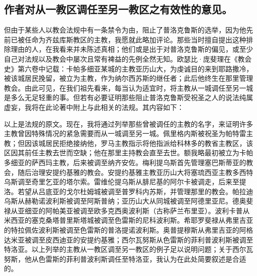 
\subsection{作者对从一教区调任至另一教区之有效性的意见。\newline{}}

但由于某些人以教会法规中有一条禁令为由，阻止了普洛克鲁斯的选举，因为他先前已被任命为齐兹库斯教区的主教，我愿就此略加评论。那些当时擅自提出这种排除理由的人，在我看来并未陈述真相；他们或是出于对普洛克鲁斯的偏见，或至少自己对法规以及教会中屡次且常有裨益的先例全然无知。欧瑟比·庞斐理在《教会史》第六卷中记载：卡帕多细亚某城的主教亚历山大，为虔诚目的来到耶路撒冷，被该城居民挽留，被立为主教，作为纳尔西苏斯的继任者；此后他终生在那里管理教会。由此可见，在我们祖先看来，每当认为适宜时，将主教从一城调任至另一城是多么无足轻重的事。但若有必要证明那些阻止普洛克鲁斯受祝圣之人的说法纯属虚妄，我将在此论著中附上与此相关的法规。其内容如下：\newline{}\par

\newline{}\par

以上是法规的原文。现在，我将通过列举那些曾被调任的主教的名字，来证明许多主教曾因特殊情况的紧急需要而从一城调至另一城。佩里格内斯被祝圣为帕特雷主教；但因该城居民拒绝接纳他，罗马主教指示将他指派给科林多的教省主教区，该区因其前任主教去世而空缺；他在那里主持教会直至去世。额我略最初被立为卡帕多细亚的萨西玛主教，后来被调至纳齐安佐。梅利提乌斯首先管理塞巴斯蒂亚的教会，随后治理安提约基雅的教会。安提约基雅主教亚历山大将塞琉西亚主教多西特乌斯调至奇里乞亚的塔尔索。雷维伦提乌斯从腓尼基的阿尔卡被调走，后来至提洛。若望从吕底亚的戈尔杜姆城被调至普罗科内苏斯，并管理那里的教会。帕拉迪乌斯从赫勒诺波利斯被调至阿斯普纳；亚历山大从同城被调至阿德里亚尼。德奥斐禄从亚细亚的阿帕美亚被调至欧多克西奥波利斯（古称萨兰布里亚）。波利卡普从米西亚的塞克桑塔普里斯塔城被调至色雷斯的尼科波利斯。希耶罗斐禄从弗里吉亚的特拉佩佐波利斯被调至色雷斯的普洛提诺波利斯。奥普提穆斯从弗里吉亚的阿格达米亚被调至皮西迪亚的安提约基雅；西尔瓦努斯从色雷斯的菲利普波利斯被调至特洛亚。以上列举的主教从一教区调至另一教区的例子足以说明问题；关于西尔瓦努斯，他从色雷斯的菲利普波利斯调任至特洛亚，我认为在此处简要叙述是合适的。\newline{}\par

